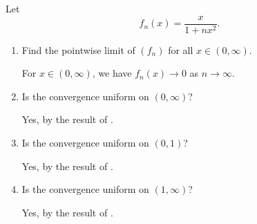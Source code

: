\begin{problem}
  Let
  \[
    f_{n}(x) = \frac{x}{1 + nx^{2}}.
  \]

  \begin{enumerate}[label=(\alph*)]
    \item Find the pointwise limit of $(f_{n})$ for all $x \in (0, \infty)$.
      
      For $x \in (0, \infty)$, we have $f_{n}(x) \to 0$ as $n \to \infty$.

    \item Is the convergence uniform on $(0, \infty)$?

      Yes, by the result of .

    \item Is the convergence uniform on $(0, 1)$?

      Yes, by the result of .

    \item Is the convergence uniform on $(1, \infty)$?

      Yes, by the result of .

  \end{enumerate}

\end{problem}

